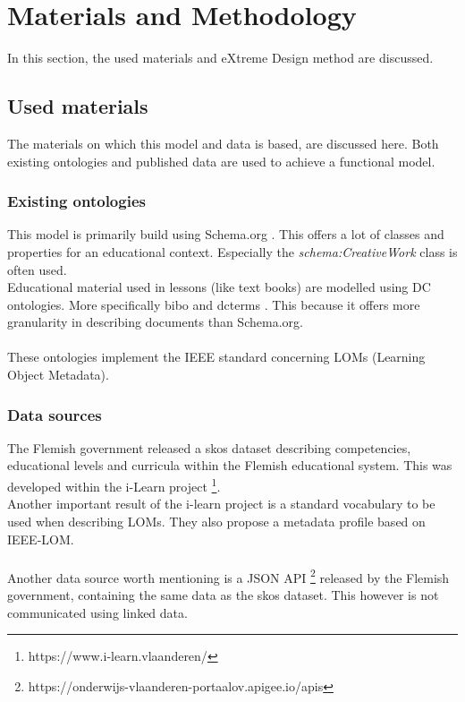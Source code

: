 \documentclass[12pt,journal]{IEEEtran}
\begin{document}
\section{Materials and Methodology}

\noindent In this section, the used materials and eXtreme Design method are discussed.

\subsection{Used materials}
\noindent The materials on which this model and data is based, are discussed here. Both existing ontologies and published data are used to achieve a functional model.

\subsubsection{Existing ontologies}
This model is primarily build using Schema.org \cite{schema}. This offers a lot of classes and properties for an educational context.
Especially the \textit{schema:CreativeWork} class is often used. \\
Educational material used in lessons (like text books) are modelled using DC \cite{dc} ontologies. More specifically bibo \cite{bibo} and dcterms \cite{dcterms}.
This because it offers more granularity in describing documents than Schema.org.\\ \\
These ontologies implement the IEEE standard \cite{ieeelom} concerning LOMs (Learning Object Metadata).

\subsubsection{Data sources}
The Flemish government released a skos dataset \cite{ilearnskosmos} describing competencies, educational levels and curricula within the Flemish educational system.
This was developed within the i-Learn project \footnote{https://www.i-learn.vlaanderen/}. \\
Another important result of the i-learn project is a standard vocabulary \cite{pubelovoc} to be used when describing LOMs.
They also propose a metadata profile \cite{pubelo} based on IEEE-LOM. \\ \\
Another data source worth mentioning is a JSON API \footnote{https://onderwijs-vlaanderen-portaalov.apigee.io/apis} released by the Flemish government, containing the same data as the skos dataset. This however is not communicated using linked data.
\end{document}
